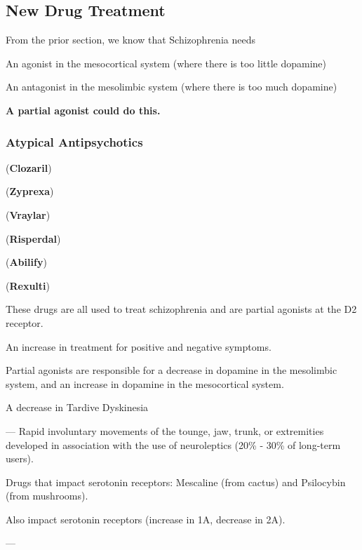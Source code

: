 \subsection{New Drug Treatment}

\begin{coloredlist}
    \item From the prior section, we know that Schizophrenia needs
    \begin{coloredlist}
        \item An agonist in the mesocortical system (where there is too little dopamine)
        \item An antagonist in the mesolimbic system (where there is too much dopamine)
        \item \textbf{A partial agonist could do this.}
    \end{coloredlist}
\end{coloredlist}

\subsubsection{Atypical Antipsychotics}

\begin{coloredlist}
\begin{multicols}{2}
    \item {} (\textbf{Clozaril})
    \item {} (\textbf{Zyprexa})
    \item {} (\textbf{Vraylar})
    \item {} (\textbf{Risperdal})
    \item {} (\textbf{Abilify})
    \item {} (\textbf{Rexulti})
\end{multicols}
    \item These drugs are all used to treat schizophrenia and are partial agonists at the D2 receptor.
    \item An increase in treatment for positive and negative symptoms.
    \item Partial agonists are responsible for a decrease in dopamine in the mesolimbic system, and an increase in dopamine in the mesocortical system.
    \item A decrease in Tardive Dyskinesia
    \item {} — Rapid involuntary movements of the tounge, jaw, trunk, or extremities developed in association with the use of neuroleptics (20\% - 30\% of long-term users).
    \item Drugs that impact serotonin receptors: Mescaline (from cactus) and Psilocybin (from mushrooms). 
    \item Also impact serotonin receptors (increase in 1A, decrease in 2A).
    \begin{coloredlist}
        \item {} — 
    \end{coloredlist}
\end{coloredlist}

